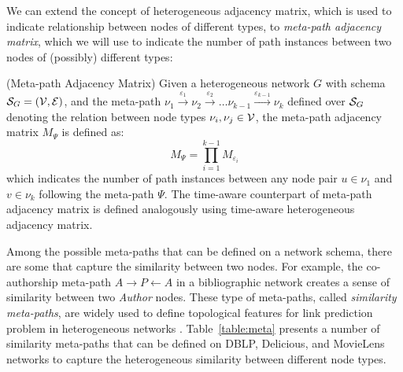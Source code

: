 {\color{red} We can extend the concept of heterogeneous adjacency matrix, which is used to indicate relationship between nodes of different types, to \emph{meta-path adjacency matrix}, which we will use to indicate the number of path instances between two nodes of (possibly) different types:

\begin{definition}{(Meta-path Adjacency Matrix)}
Given a heterogeneous network $G$ with schema $\mathcal{S}_G=(\mathcal{V}, \mathcal{E})$, and the meta-path $\nu_1\xrightarrow{\varepsilon_1}\nu_2\xrightarrow{\varepsilon_2}\dots\nu_{k-1}\xrightarrow{\varepsilon_{k-1}}\nu_k$ defined over $\mathcal{S}_G$ denoting the relation between node types $\nu_i,\nu_j\in\mathcal{V}$, the meta-path adjacency matrix $M_{\Psi}$ is defined as:
\[M_\Psi=\prod_{i=1}^{k-1}M_{\varepsilon_i}\]
which indicates the number of path instances between any node pair $u\in\nu_1$ and $v\in\nu_k$ following the meta-path $\Psi$. The time-aware counterpart of meta-path adjacency matrix is defined analogously using time-aware heterogeneous adjacency matrix.
\end{definition}
}

Among the possible meta-paths that can be defined on a network schema, there are some that capture the similarity between two nodes. For example, the co-authorship meta-path $A\rightarrow P\leftarrow A$ in a bibliographic network creates a sense of similarity between two \emph{Author} nodes. These type of meta-paths, called \emph{similarity meta-paths}, are widely used to define topological features for link prediction problem in heterogeneous networks \cite{sun2011co, zhang2014meta, 7752228}. Table~\ref{table:meta} presents a number of similarity meta-paths that can be defined on DBLP, Delicious, and MovieLens networks to capture the heterogeneous similarity between different node types.

